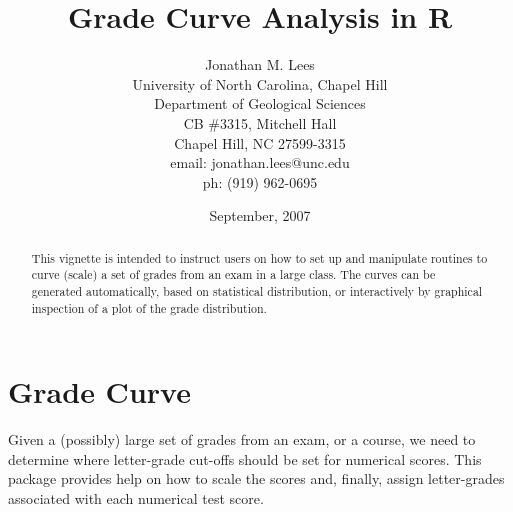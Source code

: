 \documentclass{article}
\begin{document}








\author{Jonathan M. Lees\\
University of North Carolina, Chapel Hill\\
Department of Geological Sciences\\
CB \#3315, Mitchell Hall\\
Chapel Hill, NC  27599-3315\\
email: jonathan.lees@unc.edu\\
ph: (919) 962-0695
}
\title{Grade Curve Analysis in R}
\date{September, 2007}

\maketitle


\begin{abstract}
This vignette is intended to instruct users on how to set up
and manipulate routines to curve (scale) a set of grades
from an exam in a large class.  The curves can be generated 
automatically, based on statistical distribution,
or interactively by graphical inspection of
a  plot of the grade distribution.

\end{abstract}


\section{Grade Curve}

Given a (possibly) large set of
grades from an exam, or a course, we need to determine 
where letter-grade cut-offs should be set for 
numerical scores.
This package provides help on 
how to scale the scores  and, finally,  assign 
letter-grades  associated with each numerical test score.
\end{document}
